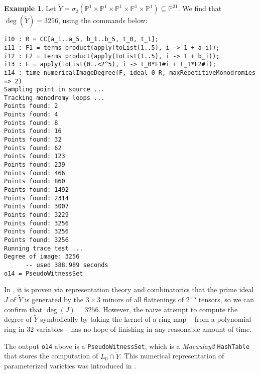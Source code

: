 \documentclass[letter]{amsart}
\theoremstyle{definition}
\newtheorem{example}[prop]{Example}
\begin{document}
\begin{example}\label{ex:raicu}
Let $\widetilde{Y} = \sigma_2({\mathbb{P}}^1 \times {\mathbb{P}}^1 \times {\mathbb{P}}^1 \times {\mathbb{P}}^1 \times {\mathbb{P}}^1) \subseteq {\mathbb{P}}^{31}$. We find that $\deg(\widetilde{Y}) = 3256$, using the commands below:

\vspace{0.1cm}

\begin{verbatim}
i10 : R = CC[a_1..a_5, b_1..b_5, t_0, t_1];
i11 : F1 = terms product(apply(toList(1..5), i -> 1 + a_i));
i12 : F2 = terms product(apply(toList(1..5), i -> 1 + b_i));
i13 : F = apply(toList(0..<2^5), i -> t_0*F1#i + t_1*F2#i);
i14 : time numericalImageDegree(F, ideal 0_R, maxRepetitiveMonodromies => 2)
Sampling point in source ...
Tracking monodromy loops ...
Points found: 2
Points found: 4
Points found: 8
Points found: 16
Points found: 32
Points found: 62
Points found: 123
Points found: 239
Points found: 466
Points found: 860
Points found: 1492
Points found: 2314
Points found: 3007
Points found: 3229
Points found: 3256
Points found: 3256
Points found: 3256
Running trace test ...
Degree of image: 3256
      -- used 388.989 seconds
o14 = PseudoWitnessSet
\end{verbatim}

\vspace{0.1cm}

\noindent In \cite[Theorem 4.1]{Rai}, it is proven via representation theory and combinatorics that the prime ideal $J$ of $\widetilde{Y}$ is generated by the $3 \times 3$ minors of all flattenings of $2^{\times 5}$ tensors, so we can confirm that $\deg(J) = 3256$.  However, the naive attempt to compute the degree of $\widetilde{Y}$ symbolically by taking the kernel of a ring map -- from a polynomial ring in 32 variables -- has no hope of finishing in any reasonable amount of time.

The output \texttt{o14} above is a \texttt{PseudoWitnessSet}, which is a \textit{Macaulay2} 
\texttt{HashTable} that 
stores the computation of $L_0 \cap \widetilde{Y}$.  This numerical representation of parameterized varieties was introduced in \cite{HS}.
\end{example}

\vspace{0.2cm}
\end{document}
